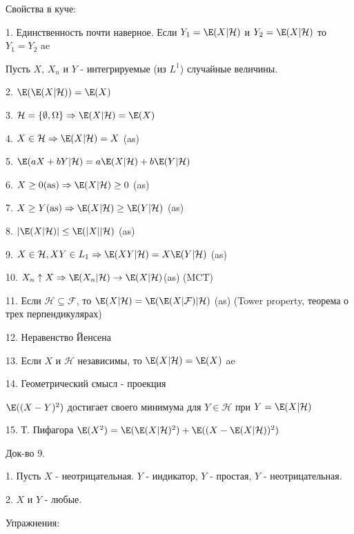 {Свойства в куче: \par
1. Единственность почти наверное. Если $Y_{1}=\E(X|\mathcal{H})$ и $Y_{2}=\E(X|\mathcal{H})$ то $Y_{1}=Y_{2}$ ae \par
Пусть $X$, $X_{n}$ и $Y$ - интегрируемые (из $L^{1}$) случайные величины. \par
2. $ \E(\E(X|\mathcal{H}))=\E(X) $ \par
3. $ \mathcal{H}=\{\emptyset,\Omega\} \Rightarrow \E(X|\mathcal{H})=\E(X) $ \par
4. $ X \in \mathcal{H} \Rightarrow \E(X|\mathcal{H})=X $ (as) \par
5. $\E(aX+bY|\mathcal{H})=a\E(X|\mathcal{H})+b\E(Y|\mathcal{H}) $ \par
6. $X \ge 0 \text{(as)} \Rightarrow \E(X|\mathcal{H})\ge 0$ (as) \par
7. $ X \ge Y \text{(as)} \Rightarrow \E(X|\mathcal{H})\ge \E(Y|\mathcal{H})$ (as) \par
8. $ |\E(X|\mathcal{H})|\le \E(|X||\mathcal{H})$ (as)  \par
9. $ X \in \mathcal{H}, XY \in L_{1} \Rightarrow \E(XY|\mathcal{H})=X\E(Y|\mathcal{H})$ (as) \par
10. $ X_{n} \uparrow X \Rightarrow \E(X_{n}|\mathcal{H})\rightarrow
\E(X|\mathcal{H})$(as) (MCT) \par
11. Если $\mathcal{H}\subseteq \mathcal{F}$, то
$\E(X|\mathcal{H})=\E(\E(X|\mathcal{F})|\mathcal{H})$ (as) (Tower property, теорема о трех перпендикулярах) \par
12. Неравенство Йенсена \par
13. Если $X$ и $\mathcal{H}$ независимы, то $\E(X|\mathcal{H})=\E(X)$ ae \par
14. Геометрический смысл - проекция \par
$\E((X-Y)^{2})$ достигает своего минимума для $Y\in\mathcal{H}$ при $Y=\E(X|\mathcal{H})$ \par
15. Т. Пифагора $\E(X^{2})=\E(\E(X|\mathcal{H})^{2})+\E((X-\E(X|\mathcal{H}))^{2})$ \par

Док-во 9. \par
1. Пусть $X$ - неотрицательная. $Y$ - индикатор, $Y$ - простая, $Y$ - неотрицательная.\par
2. $X$ и $Y$ - любые. \par

Упражнения: \par












}
